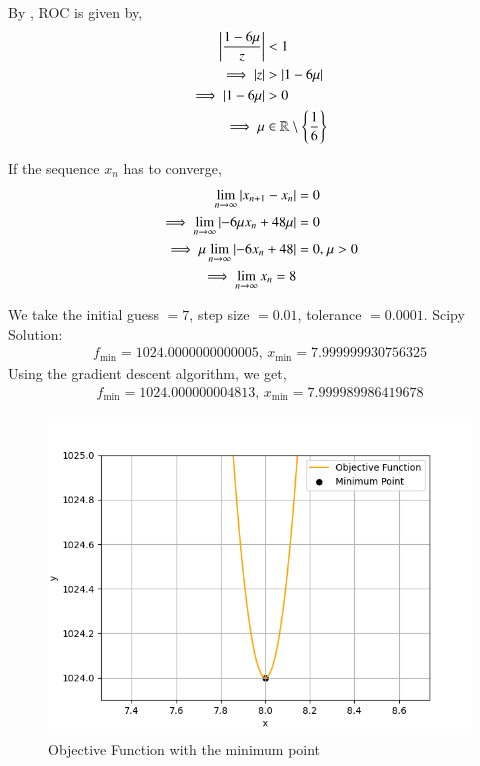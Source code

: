 \documentclass[journal]{IEEEtran}
\begin{document}
By \brak{\ref{ztrans_eq}}, ROC is given by,
\begin{align}
    \left\vert\frac{1 - 6\mu}{z}\right\vert &< 1\\
    \implies \left\vert z\right\vert &> \left\vert1 - 6\mu\right\vert\\
    \implies \left\vert1 - 6\mu\right\vert &> 0\\
    \implies \mu &\in \mathbb{R} \setminus \left\{\frac{1}{6}\right\}
\end{align}

If the sequence $x_n$ has to converge,
\begin{align}
    \lim_{n\to\infty} \left\vert x_{n + 1} - x_n\right\vert &= 0\\
    \implies \lim_{n\to\infty} \left\vert-6\mu x_n + 48\mu\right\vert &= 0\\
    \implies \mu \lim_{n\to\infty} \left\vert-6x_n + 48\right\vert &= 0 \text{, } \mu > 0\\
    \implies \lim_{n\to\infty} x_n = 8
\end{align}

We take the initial guess $= 7$, step size $= 0.01$, tolerance $= 0.0001$.
\newline
Scipy Solution:
\newline
\begin{align}
    f_{\text{min}} = 1024.0000000000005\text{, } x_{\text{min}} = 7.999999930756325
\end{align}
\newline
Using the gradient descent algorithm, we get,
\begin{align}
    f_{\text{min}} = 1024.000000004813\text{, } x_{\text{min}} = 7.999989986419678
\end{align}

\begin{figure}[h!]
   \centering
   \includegraphics[width=0.7\columnwidth]{figs/graph.png}
   \caption{Objective Function with the minimum point}
   \label{label}
\end{figure}
\end{document}
